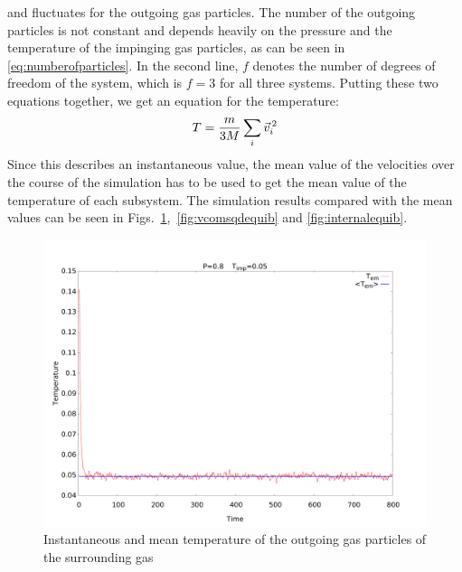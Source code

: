 \documentclass[12pt]{article}
\begin{document}
and fluctuates for the outgoing gas particles. The number of the outgoing particles is not constant and depends heavily on the pressure and the
temperature of the impinging gas particles, as can be seen in \eqref{eq:numberofparticles}. In the second line, $f$ denotes the number of degrees of
freedom of the system, which is $f=3$ for all three systems. Putting these two equations together, we get an equation for the temperature:
\begin{equation}
    T = \frac{m}{3 M} \sum_i \vec{v}_i^{\, 2} \\
\end{equation}
Since this describes an instantaneous value, the mean value of the velocities over the course of the simulation has to be used to get the mean value
of the temperature of each subsystem. The simulation results compared with the mean values can be seen in
Figs.~\ref{fig:outgoingequib},~\ref{fig:vcomsqdequib} and \ref{fig:internalequib}.
\begin{figure}[h]
    \begin{center}
        \includegraphics[scale=0.4]{images/gastemp.pdf}
        \caption{Instantaneous and mean temperature of the outgoing gas particles of the surrounding gas}
        \label{fig:outgoingequib}
    \end{center}
\end{figure}
\end{document}
